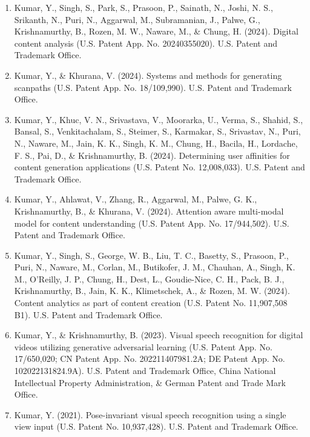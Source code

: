 \begin{enumerate}
    \item Kumar, Y., Singh, S., Park, S., Prasoon, P., Sainath, N., Joshi, N. S., Srikanth, N., Puri, N., Aggarwal, M., Subramanian, J., Palwe, G., Krishnamurthy, B., Rozen, M. W., Naware, M., \& Chung, H. (2024). Digital content analysis (U.S. Patent App. No. 20240355020). U.S. Patent and Trademark Office.

    \item Kumar, Y., \& Khurana, V. (2024). Systems and methods for generating scanpaths (U.S. Patent App. No. 18/109,990). U.S. Patent and Trademark Office.

    \item Kumar, Y., Khuc, V. N., Srivastava, V., Moorarka, U., Verma, S., Shahid, S., Bansal, S., Venkitachalam, S., Steimer, S., Karmakar, S., Srivastav, N., Puri, N., Naware, M., Jain, K. K., Singh, K. M., Chung, H., Bacila, H., Lordache, F. S., Pai, D., \& Krishnamurthy, B. (2024). Determining user affinities for content generation applications (U.S. Patent No. 12,008,033). U.S. Patent and Trademark Office.

    \item Kumar, Y., Ahlawat, V., Zhang, R., Aggarwal, M., Palwe, G. K., Krishnamurthy, B., \& Khurana, V. (2024). Attention aware multi-modal model for content understanding (U.S. Patent App. No. 17/944,502). U.S. Patent and Trademark Office.
    
    \item Kumar, Y., Singh, S., George, W. B., Liu, T. C., Basetty, S., Prasoon, P., Puri, N., Naware, M., Corlan, M., Butikofer, J. M., Chauhan, A., Singh, K. M., O'Reilly, J. P., Chung, H., Dest, L., Goudie-Nice, C. H., Pack, B. J., Krishnamurthy, B., Jain, K. K., Klimetschek, A., \& Rozen, M. W. (2024). Content analytics as part of content creation (U.S. Patent No. 11,907,508 B1). U.S. Patent and Trademark Office.
    
    \item Kumar, Y., \& Krishnamurthy, B. (2023). Visual speech recognition for digital videos utilizing generative adversarial learning (U.S. Patent App. No. 17/650,020; CN Patent App. No. 202211407981.2A; DE Patent App. No. 102022131824.9A). U.S. Patent and Trademark Office, China National Intellectual Property Administration, \& German Patent and Trade Mark Office.

    \item Kumar, Y. (2021). Pose-invariant visual speech recognition using a single view input (U.S. Patent No. 10,937,428). U.S. Patent and Trademark Office.

\end{enumerate}


